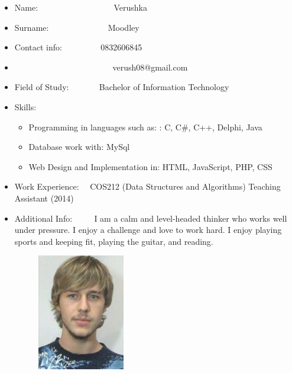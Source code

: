 \documentclass[12pt]{article}
\begin{document}
\begin{itemize}
	\item Name: \ ~~~~~~~~~~~~~~~ \ Verushka
	\item Surname: \ ~~~~~~~~~~~ \ Moodley
	\item Contact info: \ ~~~~~~ \  0832606845
	\item \ ~~~~~~~~~~~~~~~~~~~~~ \ verush08@gmail.com
	\item Field of Study: \ ~~~~ \ Bachelor of Information Technology
	\item Skills: \begin{itemize}
					\item Programming in languages such as: : C, C\#, C++, Delphi, Java
					\item Database work with: MySql
					\item Web Design and Implementation in: HTML, JavaScript, PHP, CSS 
				  \end{itemize}
	\item Work Experience: \  \ COS212 (Data Structures and Algorithms) Teaching Assistant (2014)
	\item Additional Info: \ ~~ \ I am a calm and level-headed thinker who works well under pressure. I enjoy a challenge and love to work hard. I enjoy playing sports and keeping fit, playing the guitar, and reading.	
\end{itemize}

\newpage 
\begin{figure}[ht!]
	\centering
	\includegraphics[width=2in, height=2in]{./Pictures/Eduan.jpg}
\end{figure}
\end{document}
